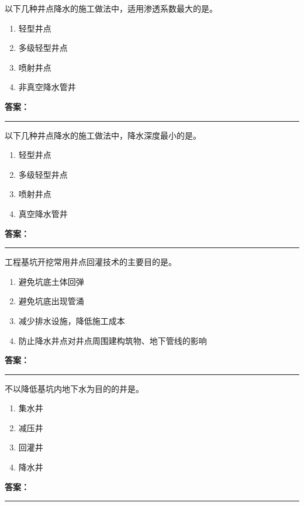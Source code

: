 \documentclass[UTF8,fontset=fandol,11pt]{ctexart}
\newcommand{\answerline}{\textcolor{answerred}{\rule{2.4cm}{0.7pt}}}
\begin{document}
\begin{quizbox}[title={第 16 题}]
以下几种井点降水的施工做法中，适用渗透系数最大的是。\\
\begin{enumerate}[label=\Alph*.]
\item 轻型井点
\item 多级轻型井点
\item 喷射井点
\item 非真空降水管井
\end{enumerate}
\textbf{\textcolor{answerred}{答案：}} \answerline
\end{quizbox}

\begin{quizbox}[title={第 17 题}]
以下几种井点降水的施工做法中，降水深度最小的是。\\
\begin{enumerate}[label=\Alph*.]
\item 轻型井点
\item 多级轻型井点
\item 喷射井点
\item 真空降水管井
\end{enumerate}
\textbf{\textcolor{answerred}{答案：}} \answerline
\end{quizbox}

\begin{quizbox}[title={第 18 题}]
工程基坑开挖常用井点回灌技术的主要目的是。\\
\begin{enumerate}[label=\Alph*.]
\item 避免坑底土体回弹
\item 避免坑底出现管涌
\item 减少排水设施，降低施工成本
\item 防止降水井点对井点周围建构筑物、地下管线的影响
\end{enumerate}
\textbf{\textcolor{answerred}{答案：}} \answerline
\end{quizbox}

\begin{quizbox}[title={第 19 题}]
不以降低基坑内地下水为目的的井是。\\
\begin{enumerate}[label=\Alph*.]
\item 集水井
\item 减压井
\item 回灌井
\item 降水井
\end{enumerate}
\textbf{\textcolor{answerred}{答案：}} \answerline
\end{quizbox}
\end{document}
